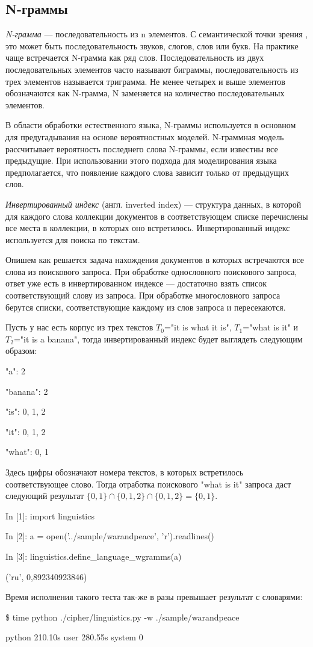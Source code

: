 \subsection{N-граммы}
\DEF\textit{N-грамма} — последовательность из n элементов. С семантической точки зрения
, это может быть последовательность звуков, слогов, слов или букв. На практике 
чаще встречается N-грамма как ряд слов. Последовательность из двух последовательных 
элементов часто называют биграммы, последовательность из трех элементов 
называется триграмма. Не менее четырех и выше элементов обозначаются как 
N-грамма, N заменяется на количество последовательных элементов.

В области обработки естественного языка, N-граммы используется в основном для предугадывания на основе вероятностных моделей. N-граммная модель рассчитывает вероятность последнего слова N-граммы, если известны все предыдущие. При использовании этого подхода для моделирования языка предполагается, что появление каждого слова зависит только от предыдущих слов.

\DEF\textit{Инвертированный индекс} (англ. inverted index) — структура данных, в которой для каждого слова коллекции документов в соответствующем списке перечислены все места в коллекции, в которых оно встретилось. Инвертированный индекс используется для поиска по текстам.

Опишем как решается задача нахождения документов в которых встречаются все слова из поискового запроса. При обработке однословного поискового запроса, ответ уже есть в инвертированном индексе — достаточно взять список соответствующий слову из запроса. При обработке многословного запроса берутся списки, соответствующие каждому из слов запроса и пересекаются.

Пусть у нас есть корпус из трех текстов $T_0$="it is what it is", $T_1$="what is it" и $T_2$="it is a banana", тогда инвертированный индекс будет выглядеть следующим образом:

"a":      {2}

"banana": {2}

"is":     {0, 1, 2}

"it":     {0, 1, 2}

"what":   {0, 1}

Здесь цифры обозначают номера текстов, в которых встретилось соответствующее слово. Тогда отработка поискового "what is it" запроса даст следующий результат $\{0,1\} \cap \{0,1,2\} \cap \{0,1,2\} = \{0,1\}$.

In [1]: import linguistics

In [2]: a = open('../sample/warandpeace', 'r').readlines()

In [3]: linguistics.define\_language\_wgramms(a)

('ru', 0,892340923846)

Время исполнения такого теста так-же в разы превышает результат с словарями:

\$ time python ./cipher/linguistics.py -w ./sample/warandpeace 

python  210.10s user 280.55s system 0%

